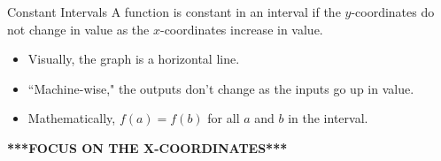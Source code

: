\documentclass[t,usenames,dvipsnames]{beamer}
\begin{document}
\begin{frame}{Constant Intervals}
A function is \alert{constant} in an interval if the $y$-coordinates do not change in value as the $x$-coordinates increase in value.  \newline\\  \pause

\begin{itemize}
    \item Visually, the graph is a horizontal line.   \newline\\  \pause
    \item ``Machine-wise," the outputs don't change as the inputs go up in value. \newline\\  \pause
    \item Mathematically, $f(a) = f(b)$ for all $a$ and $b$ in the interval.    \newline\\  \pause
\end{itemize}

\begin{center}
    {\color{red}\textbf{***FOCUS ON THE X-COORDINATES***}}
\end{center}
\end{frame}
\end{document}
